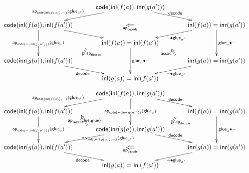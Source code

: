 \message{ !name(decode-cube.tex)}\documentclass{amsart}
\def\code{\mathsf{code}}
\def\inl{\mathsf{inl}}
\def\inr{\mathsf{inr}}
\def\glue{\mathsf{glue}}
\def\decode{\mathsf{decode}}
\def\ap{\mathsf{ap}}
\def\assoc{\mathsf{assoc}}
\begin{document}


\[\begin{array}{c}\xymatrix@R=1pc@C=1pc{
  && \code(\inl(f(a)),\inr(g(a')))\ar[dll]_{\mathllap{\ap_{\code(\inl(f(a)),-)}(\glue_{a'})}} \ar[drr]^{\decode}
  \ar@{}[dd]_{}="d1" \ar@{=>}"d1"+/^ 0.5pc/;"d1"+/_ 0.5pc/ ^{\ap_{\decode}}
  \\
  \code(\inl(f(a)),\inl(f(a')))\ar[dd]|{\ap_{\code(-,\inl (f(a')))}(\glue_a)}\ar[drr]
   \ar@{}[dddrr]_{}="l1" \ar@{=>}"l1"+/^ 0.5pc/;"l1"+/_ 0.5pc/  ^{\ap_{\decode}}
  &&&&
  \inl(f(a))=\inr(g(a'))\ar[dd]^{\glue_{a}\bullet -}\ar[dll]^{-\bullet \glue_{a'}}
  \ar@{}[dddll]_{}="o1" \ar@{=>}"o1"+/^ 0.5pc/;"o1"+/_ 0.5pc/  ^{\assoc}
  \\
  && \inl(f(a))=\inl(f(a')) \ar[dd]^{\glue_{a}\bullet -} \\
  \code(\inr(g(a)),\inl(f(a')))\ar[drr]_{\decode}
  &&&& \inr(g(a))=\inr(g(a')) \ar[dll]^{-\bullet \glue_{a'}}\\
  && \inl(g(a))=\inl(f(a'))
}\end{array}
\]
\vspace{1cm}
\[
\begin{array}{c}\xymatrix@R=1pc@C=1pc{
  && \code(\inl(f(a)),\inr(g(a')))\ar[dll]_{\mathllap{\ap_{\code(\inl(f(a)),-)}(\glue_{a'})}} \ar[drr]^{\decode} \ar[dd]|{\ap_{\code(-,\inr (g(a')))}(\glue_a)}
  \ar@{}[dddrr]_{}="l2" \ar@{=>}"l2"+/^ 0.5pc/;"l2"+/_ 0.5pc/  ^{\ap_{\decode}}
  \ar@{}[dddll]_{}="o2" \ar@{=>}"o2"+/^ 0.8pc/;"o2"+/_ 0.8pc/  |{\ap_{\code}(\glue,\glue)}
  \\
  \code(\inl(f(a)),\inl(f(a')))\ar[dd]|{\ap_{\code(-,\inl (f(a')))}(\glue_a)}
  &&&&
  \inl(f(a))=\inr(g(a'))\ar[dd]^{\glue_{a}\bullet -}
  \\
  && \code(\inr(g(a)),\inr(g(a')))\ar[dll]|{\ap\mathrlap{{}_{\code(\inr(g(a)),-)}(\glue_{a'})}} \ar[drr]^{\decode}
  \ar@{}[dd]_{}="d2" \ar@{=>}"d2"+/^ 0.5pc/;"d2"+/_ 0.5pc/ ^{\ap_{\decode}}
  \\
  \code(\inr(g(a)),\inl(f(a')))\ar[drr]_{\decode}
  &&&& \inr(g(a))=\inr(g(a')) \ar[dll]^{-\bullet \glue_{a'}}\\
  && \inl(g(a))=\inl(f(a'))
}\end{array}\]
\end{document}
